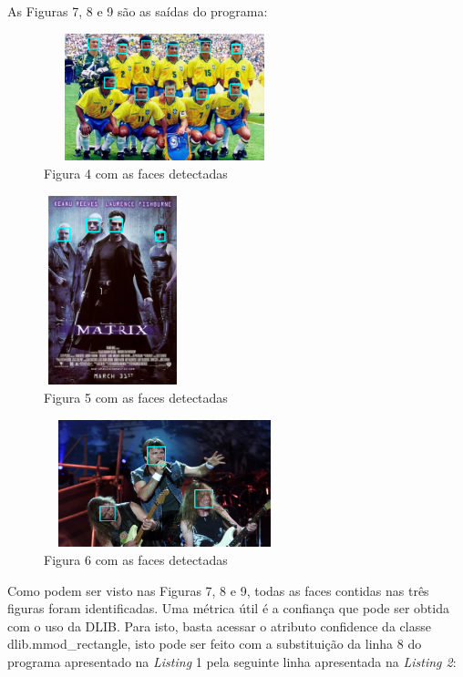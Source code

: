 \documentclass[conference]{IEEEtran}
\begin{document}
        
		As Figuras 7, 8 e 9 são as saídas do programa:
		
		 \begin{figure}[h!b]
			\centering \includegraphics[width=7cm,height=3.7cm]{brasil_1994_detectada.png}
			\caption{Figura 4 com as faces detectadas} 
		\end{figure}
		
	    \begin{figure}[h!b]
			\centering \includegraphics[width=4cm,height=5.5cm]{matrix_detectada.png}
			\caption{Figura 5 com as faces detectadas} 
		\end{figure}

         \begin{figure}[h]
			\centering \includegraphics[width=7cm,height=3.7cm]{iron_detectada.png}
			\caption{Figura 6 com as faces detectadas} 
		\end{figure}
	
        Como podem ser visto nas Figuras 7, 8 e 9, todas as faces contidas nas três figuras foram identificadas. Uma métrica útil é a confiança que pode ser obtida com o uso da DLIB. Para isto, basta acessar o atributo confidence da classe dlib.mmod\_rectangle, isto pode ser feito com a substituição da linha 8 do programa apresentado na \textit{Listing} 1 pela seguinte linha apresentada na \textit{Listing 2}:
        
\end{document}
